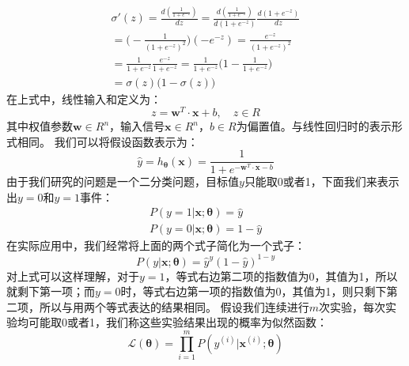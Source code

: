 \documentclass[UTF8]{article}
\begin{document}
\begin{equation}
\begin{aligned}
\sigma ' (z) = \frac{d(\frac{1}{1+e^{-z}})}{dz}= \frac{d(\frac{1}{1+e^{-z}})}{d(1+e^{-z})}\frac{d(1+e^{-z})}{dz} \\
= \Big( -\frac{1}{(1+e^{-z})^{2}} \Big)(-e^{-z})=\frac{e^{-z}}{(1+e^{-z})^{2}} \\
=\frac{1}{1+e^{-z}}\frac{e^{-z}}{1+e^{-z}}=\frac{1}{1+e^{-z}}\Big( 1 - \frac{1}{1+e^{-z}} \Big) \\
=\sigma(z)\Big( 1 - \sigma(z) \Big)
\end{aligned}
\label{lcrn-sigmoid-gradient-formula}
\end{equation}
在上式中，线性输入和定义为：
\begin{equation}
z = \boldsymbol{w}^{T} \cdot \boldsymbol{x} + b, \quad z \in R
\label{lcrn-z-def}
\end{equation}
其中权值参数$\boldsymbol{w} \in R^{n}$，输入信号$\boldsymbol{x} \in R^{n}$，$b \in R$为偏置值。与线性回归时的表示形式相同。\newline
我们可以将假设函数表示为：
\begin{equation}
\hat{y}=h_{\boldsymbol{\theta}} (\boldsymbol{x}) = \frac{1}{1 + e^{-\boldsymbol{w}^{T} \cdot \boldsymbol{x} - b}}
\label{lcrn-h-theta-def}
\end{equation}
由于我们研究的问题是一个二分类问题，目标值$y$只能取0或者1，下面我们来表示出$y=0$和$y=1$事件：
\begin{equation}
\begin{aligned}
P(y=1 \vert \boldsymbol{x}; \boldsymbol{\theta}) = \hat{y} \\
P(y=0 \vert \boldsymbol{x}; \boldsymbol{\theta}) = 1 - \hat{y}
\end{aligned}
\label{lcrn-y0-y1-def}
\end{equation}
在实际应用中，我们经常将上面的两个式子简化为一个式子：
\begin{equation}
P(y \vert \boldsymbol{x}; \boldsymbol{\theta}) =  \hat{y}^{y} ( 1 - \hat{y} )^{1-y}
\label{lcrn-y0-y1-merged}
\end{equation}
对上式可以这样理解，对于$y=1$，等式右边第二项的指数值为0，其值为1，所以就剩下第一项；而$y=0$时，等式右边第一项的指数值为0，其值为1，则只剩下第二项，所以与用两个等式表达的结果相同。\newline
假设我们连续进行$m$次实验，每次实验均可能取0或者1，我们称这些实验结果出现的概率为似然函数：
\begin{equation}
\mathcal{L}(\boldsymbol{\theta}) = \prod_{i=1}^{m} P( y^{(i)} \vert \boldsymbol{x}^{(i)}; \boldsymbol{\theta} )
\label{lcrn-likelyhood-function-def}
\end{equation}
\end{document}
